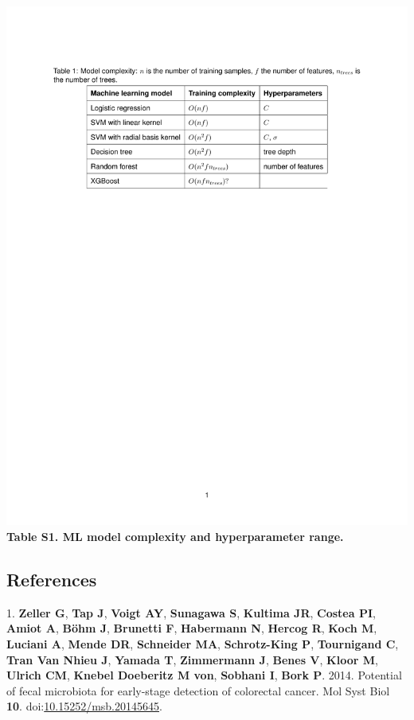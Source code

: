 \documentclass[11pt,]{article}
\begin{document}
\newpage

\includegraphics{TableS1.pdf} \textbf{Table S1. ML model complexity and
hyperparameter range.} \newpage

\subsection{References}\label{references}

\hypertarget{refs}{}
\hypertarget{ref-zeller_potential_2014}{}
1. \textbf{Zeller G}, \textbf{Tap J}, \textbf{Voigt AY},
\textbf{Sunagawa S}, \textbf{Kultima JR}, \textbf{Costea PI},
\textbf{Amiot A}, \textbf{Böhm J}, \textbf{Brunetti F},
\textbf{Habermann N}, \textbf{Hercog R}, \textbf{Koch M},
\textbf{Luciani A}, \textbf{Mende DR}, \textbf{Schneider MA},
\textbf{Schrotz-King P}, \textbf{Tournigand C}, \textbf{Tran Van Nhieu
J}, \textbf{Yamada T}, \textbf{Zimmermann J}, \textbf{Benes V},
\textbf{Kloor M}, \textbf{Ulrich CM}, \textbf{Knebel Doeberitz M von},
\textbf{Sobhani I}, \textbf{Bork P}. 2014. Potential of fecal microbiota
for early-stage detection of colorectal cancer. Mol Syst Biol
\textbf{10}.
doi:\href{https://doi.org/10.15252/msb.20145645}{10.15252/msb.20145645}.
\end{document}
